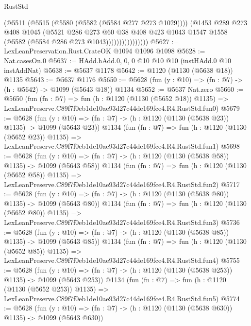 \begin{lexlean}{RustStd}
\begin{coremodule}
                          (@5511
                            (@5515 (@5580 (@5582 (@5584 @277 @273 @1029))))
                            (@1453
                              @289
                              @273
                              @408
                              @1045
                              (@5521
                                @286
                                @273
                                @60
                                @38
                                @408
                                @423
                                @1043
                                @1547
                                @1558
                                (@5582 (@5584 @286 @273 @1043))))))))))))))))
@5627 := LexLeanPreservation.Rust.CrateOK @1094 @1096 @1098
@5628 := Nat.casesOn.{0}
@5637 := HAdd.hAdd.{0, 0, 0} @10 @10 @10 (instHAdd.{0} @10 instAddNat)
@5638 := @5637 @1178
@5642 := @1120 (@1130 (@5638 @18)) @1135
@5643 := @5637 @1176
@5650 := @5628 (fun (y : @10) => (fn : @7) -> (h : @5642) -> @1099 (@5643 @18)) @1134
@5652 := @5637 Nat.zero
@5660 := @5650
    (fun (fn : @7) =>
    fun (h : @1120 (@1130 (@5652 @18)) @1135) =>
    LexLeanPreserve.C89f7f0eb1de10ae93d27c44de169fce4.R4.RustStd.fun0)
@5679 := @5628
    (fun (y : @10) => (fn : @7) -> (h : @1120 (@1130 (@5638 @23)) @1135) -> @1099 (@5643 @23))
    @1134
    (fun (fn : @7) =>
    fun (h : @1120 (@1130 (@5652 @23)) @1135) =>
    LexLeanPreserve.C89f7f0eb1de10ae93d27c44de169fce4.R4.RustStd.fun1)
@5698 := @5628
    (fun (y : @10) => (fn : @7) -> (h : @1120 (@1130 (@5638 @58)) @1135) -> @1099 (@5643 @58))
    @1134
    (fun (fn : @7) =>
    fun (h : @1120 (@1130 (@5652 @58)) @1135) =>
    LexLeanPreserve.C89f7f0eb1de10ae93d27c44de169fce4.R4.RustStd.fun2)
@5717 := @5628
    (fun (y : @10) => (fn : @7) -> (h : @1120 (@1130 (@5638 @80)) @1135) -> @1099 (@5643 @80))
    @1134
    (fun (fn : @7) =>
    fun (h : @1120 (@1130 (@5652 @80)) @1135) =>
    LexLeanPreserve.C89f7f0eb1de10ae93d27c44de169fce4.R4.RustStd.fun3)
@5736 := @5628
    (fun (y : @10) => (fn : @7) -> (h : @1120 (@1130 (@5638 @85)) @1135) -> @1099 (@5643 @85))
    @1134
    (fun (fn : @7) =>
    fun (h : @1120 (@1130 (@5652 @85)) @1135) =>
    LexLeanPreserve.C89f7f0eb1de10ae93d27c44de169fce4.R4.RustStd.fun4)
@5755 := @5628
    (fun (y : @10) => (fn : @7) -> (h : @1120 (@1130 (@5638 @253)) @1135) -> @1099 (@5643 @253))
    @1134
    (fun (fn : @7) =>
    fun (h : @1120 (@1130 (@5652 @253)) @1135) =>
    LexLeanPreserve.C89f7f0eb1de10ae93d27c44de169fce4.R4.RustStd.fun5)
@5774 := @5628
    (fun (y : @10) => (fn : @7) -> (h : @1120 (@1130 (@5638 @630)) @1135) -> @1099 (@5643 @630))

\end{coremodule}
\end{lexlean}
